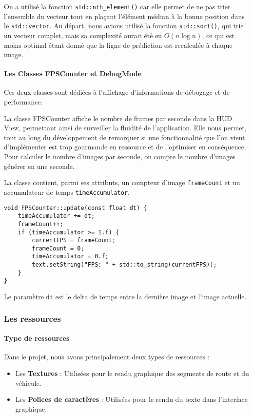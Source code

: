 On a utilisé la fonction \texttt{std::nth\_element()} car elle permet de ne pas trier l'ensemble du vecteur tout en plaçant l'élément médian à la bonne position dans le \texttt{std::vector}.
Au départ, nous avions utilisé la fonction \texttt{std::sort()}, qui trie un vecteur complet, mais sa complexité aurait été en \( O(n \log n) \)\cite{cpp_reference_std_sort}, ce qui est moins optimal étant donné que la ligne de prédiction est recalculée à chaque image.

\paragraph[FPSCounter \& DebugMode]{Les Classes FPSCounter et DebugMode}
Ces deux classes sont dédiées à l'affichage d'informations de débogage et de performance.

La classe FPSCounter affiche le nombre de frames par seconde dans la HUD View, permettant ainsi de surveiller la fluidité de l'application.
Elle nous permet, tout au long du développement de remarquer si une fonctionnalité que l'on vient d'implémenter est trop gourmande en ressource et de l'optimiser en conséquence.
Pour calculer le nombre d'images par seconde, on compte le nombre d'images générer en une seconde.

La classe contient, parmi ses attributs, un compteur d'image \texttt{frameCount} et un accumulateur de temps \texttt{timeAccumulator}.
\begin{lstlisting}[style=CStyle, label={lst:code_fpscounter}]
void FPSCounter::update(const float dt) {
    timeAccumulator += dt;
    frameCount++;
    if (timeAccumulator >= 1.f) {
        currentFPS = frameCount;
        frameCount = 0;
        timeAccumulator = 0.f;
        text.setString("FPS: " + std::to_string(currentFPS));
    }
}
\end{lstlisting}
Le paramètre \texttt{dt} est le delta de temps entre la dernière image et l'image actuelle.


\subsubsection{Les ressources}\label{subsubsec:gestion-des-ressources}
\paragraph{Type de ressources}
Dans le projet, nous avons principalement deux types de ressources :
\begin{itemize}
    \item Les \textbf{Textures} : Utilisées pour le rendu graphique des segments de route et du véhicule.
    \item Les \textbf{Polices de caractères} : Utilisées pour le rendu du texte dans l'interface graphique.
\end{itemize}

